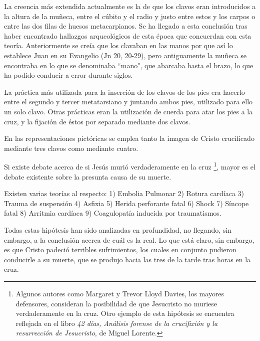 La creencia más extendida actualmente es la de que los clavos eran introducidos a la altura de la muñeca, entre el cúbito y el radio y justo entre estos y los carpos o entre las dos filas de huesos metacarpianos. Se ha llegado a esta conclusión tras haber encontrado hallazgos arqueológicos de esta época que concuerdan con esta teoría. Anteriormente se creía que los clavaban en las manos por que así lo establece Juan en su Evangelio (Jn 20, 20-29), pero antiguamente la muñeca se encontraba en lo que se denominaba ``mano", que abarcaba hasta el brazo, lo que ha podido conducir a error durante siglos.

La práctica más utilizada para la inserción de los clavos de los pies era hacerlo entre el segundo y tercer metatarsiano y juntando ambos pies, utilizado para ello un solo clavo. Otras prácticas eran la utilización de cuerda para atar los pies a la cruz, y la fijación de éstos por separado mediante dos clavos.

En las representaciones pictóricas se emplea tanto la imagen de Cristo crucificado mediante tres clavos como mediante cuatro.


Si existe debate acerca de si Jesús murió verdaderamente en la cruz \footnote{Algunos autores como Margaret y Trevor Lloyd Davies, los mayores defensores, consideran la posibilidad de que Jesucristo no muriese verdaderamente en la cruz. Otro ejemplo de esta hipótesis se encuentra reflejada en el libro \textit{42 días, Análisis forense de la crucifixión y la resurrección de Jesucristo}, de Miguel Lorente.}, mayor es el debate existente sobre la presunta causa de su muerte.

Existen varias teorías al respecto: 1) Embolia Pulmonar 2) Rotura cardíaca 3) Trauma de suspensión 4) Asfixia 5) Herida perforante fatal 6) Shock 7) Síncope fatal 8) Arritmia cardíaca 9) Coagulopatía inducida por traumatismos.

Todas estas hipótesis han sido analizadas en profundidad, no llegando, sin embargo, a la conclusión acerca de cuál es la real. Lo que está claro, sin embargo, es que Cristo padeció terribles sufrimientos, los cuales en conjunto pudieron conducirle a su muerte, que se produjo hacia las tres de la tarde tras horas en la cruz.

